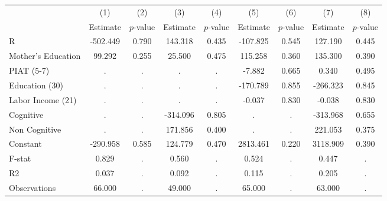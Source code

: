 \begin{tabular}{lcccccccc} \toprule
 & (1) & (2) & (3) & (4) & (5) & (6) & (7) & (8) \\ 
 & Estimate  & $p$-value  & Estimate  & $p$-value  & Estimate  & $p$-value  & Estimate  & $p$-value  \\  \midrule
R &  -502.449 &     0.790 &   143.318 &     0.435 &  -107.825 &     0.545 &   127.190 &     0.445 \\  
Mother's Education &    99.292 &     0.255 &    25.500 &     0.475 &   115.258 &     0.360 &   135.300 &     0.390 \\  
PIAT (5-7) &         . &         . &         . &         . &    -7.882 &     0.665 &     0.340 &     0.495 \\  
Education (30) &         . &         . &         . &         . &  -170.789 &     0.855 &  -266.323 &     0.845 \\  
Labor Income (21) &         . &         . &         . &         . &    -0.037 &     0.830 &    -0.038 &     0.830 \\  
Cognitive &         . &         . &  -314.096 &     0.805 &         . &         . &  -313.968 &     0.655 \\  
Non Cognitive &         . &         . &   171.856 &     0.400 &         . &         . &   221.053 &     0.375 \\  
Constant &  -290.958 &     0.585 &   124.779 &     0.470 &  2813.461 &     0.220 &  3118.909 &     0.390 \\  \midrule
F-stat &     0.829 &         . &     0.560 &         . &     0.524 &         . &     0.447 &         . \\  
R2 &     0.037 &         . &     0.092 &         . &     0.115 &         . &     0.205 &         . \\  
Observations &    66.000 &         . &    49.000 &         . &    65.000 &         . &    63.000 &         . \\  
\bottomrule \end{tabular}
